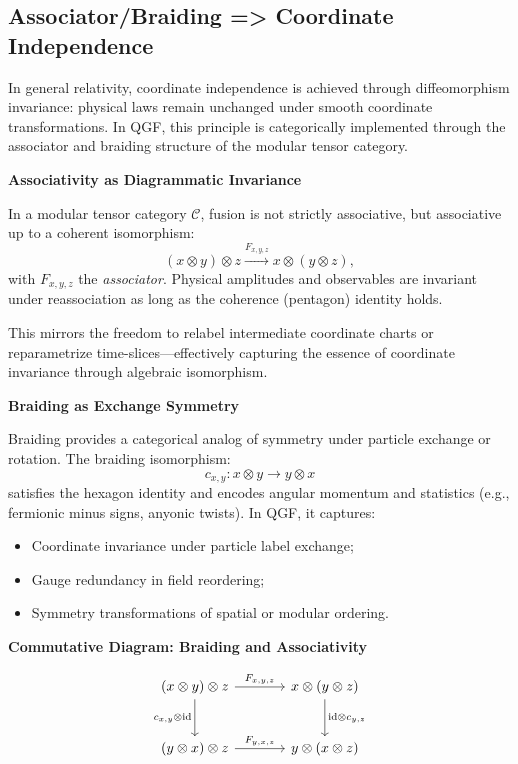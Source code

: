 \documentclass[11pt]{article}
\def\texorpdfstring#1#2{#2}
\begin{document}
\subsection{\texorpdfstring{Associator/Braiding \( \Rightarrow \) Coordinate Independence}{Associator/Braiding => Coordinate Independence}}


In general relativity, coordinate independence is achieved through diffeomorphism invariance: physical laws remain unchanged under smooth coordinate transformations. In QGF, this principle is categorically implemented through the associator and braiding structure of the modular tensor category.

\vspace{0.5em}
\noindent\textbf{Associativity as Diagrammatic Invariance}

In a modular tensor category \( \mathcal{C} \), fusion is not strictly associative, but associative up to a coherent isomorphism:
\[
(x \otimes y) \otimes z \xrightarrow{F_{x,y,z}} x \otimes (y \otimes z),
\]
with \( F_{x,y,z} \) the \emph{associator}. Physical amplitudes and observables are invariant under reassociation as long as the coherence (pentagon) identity holds.

This mirrors the freedom to relabel intermediate coordinate charts or reparametrize time-slices—effectively capturing the essence of coordinate invariance through algebraic isomorphism.

\vspace{0.5em}
\noindent\textbf{Braiding as Exchange Symmetry}

Braiding provides a categorical analog of symmetry under particle exchange or rotation. The braiding isomorphism:
\[
c_{x,y}: x \otimes y \rightarrow y \otimes x
\]
satisfies the hexagon identity and encodes angular momentum and statistics (e.g., fermionic minus signs, anyonic twists). In QGF, it captures:
\begin{itemize}
  \item Coordinate invariance under particle label exchange;
  \item Gauge redundancy in field reordering;
  \item Symmetry transformations of spatial or modular ordering.
\end{itemize}

\vspace{0.5em}
\noindent\textbf{Commutative Diagram: Braiding and Associativity}

\begin{equation*}
\begin{tikzcd}[column sep=large, row sep=large]
(x \otimes y) \otimes z \arrow{r}{F_{x,y,z}} \arrow{d}[swap]{c_{x,y} \otimes \text{id}} & x \otimes (y \otimes z) \arrow{d}{\text{id} \otimes c_{y,z}} \\
(y \otimes x) \otimes z \arrow{r}{F_{y,x,z}} & y \otimes (x \otimes z)
\end{tikzcd}
\end{equation*}
\end{document}

